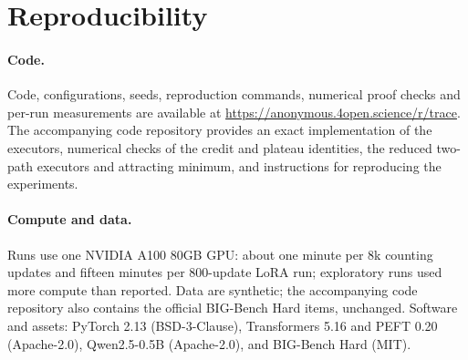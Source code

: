 \section{Reproducibility}
\label{app:reproducibility}

\paragraph{Code.} Code, configurations, seeds, reproduction commands, numerical proof checks and per-run measurements are available at
\url{https://anonymous.4open.science/r/trace}. The accompanying code repository provides an exact implementation of the executors,
numerical checks of the credit and plateau identities, the reduced two-path executors and attracting minimum, and instructions for reproducing the experiments.

\paragraph{Compute and data.} Runs use one NVIDIA A100 80GB GPU: about one minute per $8$k counting updates and fifteen minutes per
$800$-update LoRA run; exploratory runs used more compute than reported. Data are synthetic; the accompanying code repository also
contains the official BIG-Bench Hard items, unchanged. Software and assets: PyTorch 2.13 (BSD-3-Clause), Transformers 5.16 and PEFT 0.20 (Apache-2.0), Qwen2.5-0.5B \citep{qwen2025qwen25} (Apache-2.0), and BIG-Bench Hard \citep{suzgun2022challenging} (MIT).

